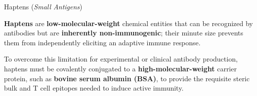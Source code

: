     \begin{core}{Haptens (\textit{Small Antigens})}

      \textbf{Haptens} are \textbf{low-molecular-weight} chemical entities that can be recognized by antibodies but are \textbf{inherently non-immunogenic}; their minute size prevents them from independently eliciting an adaptive immune response.


      To overcome this limitation for experimental or clinical antibody production, haptens must be covalently conjugated to a \textbf{high-molecular-weight} carrier protein, such as \textbf{bovine serum albumin (BSA)}, to provide the requisite steric bulk and T cell epitopes needed to induce active immunity.

    \end{core}

